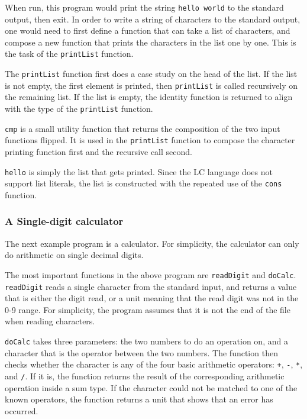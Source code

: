 \documentclass[12pt]{article}
\begin{document}
When run, this program would print the string \verb$hello world$ to the standard
output, then exit. In order to write a string of characters to the standard
output, one would need to first define a function that can take a list of
characters, and compose a new function that prints the characters in the list
one by one. This is the task of the \verb$printList$ function.

The \verb$printList$ function first does a case study on the head of the list.
If the list is not empty, the first element is printed, then \verb$printList$ is
called recursively on the remaining list. If the list is empty, the identity
function is returned to align with the type of the \verb$printList$ function.

\verb$cmp$ is a small utility function that returns the composition of the two
input functions flipped. It is used in the \verb$printList$ function to compose
the character printing function first and the recursive call second.

\verb$hello$ is simply the list that gets printed. Since the LC language does
not support list literals, the list is constructed with the repeated use of the
\verb$cons$ function.

\subsubsection{A Single-digit calculator}

The next example program is a calculator. For simplicity, the calculator can
only do arithmetic on single decimal digits.



The most important functions in the above program are \verb$readDigit$ and
\verb$doCalc$. \verb$readDigit$ reads a single character from the standard
input, and returns a value that is either the digit read, or a unit meaning that
the read digit was not in the 0-9 range. For simplicity, the program assumes
that it is not the end of the file when reading characters.

\verb$doCalc$ takes three parameters: the two numbers to do an operation on, and
a character that is the operator between the two numbers. The function then
checks whether the character is any of the four basic arithmetic operators:
\verb$+$, \verb$-$, \verb$*$, and \verb$/$. If it is, the function returns the
result of the corresponding arithmetic operation inside a sum type. If the
character could not be matched to one of the known operators, the function
returns a unit that shows that an error has occurred.
\end{document}
